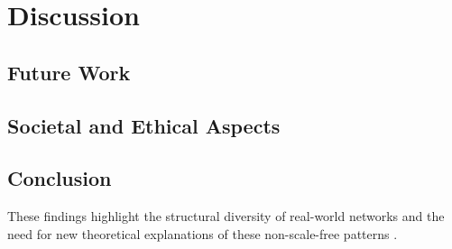 
\chapter{Discussion}

\bigskip

\section{Future Work}


\section{Societal and Ethical Aspects}

\section{Conclusion}

These findings highlight the structural diversity of real-world networks and the need for new theoretical explanations of these non-scale-free patterns \citep{Broido2019}.